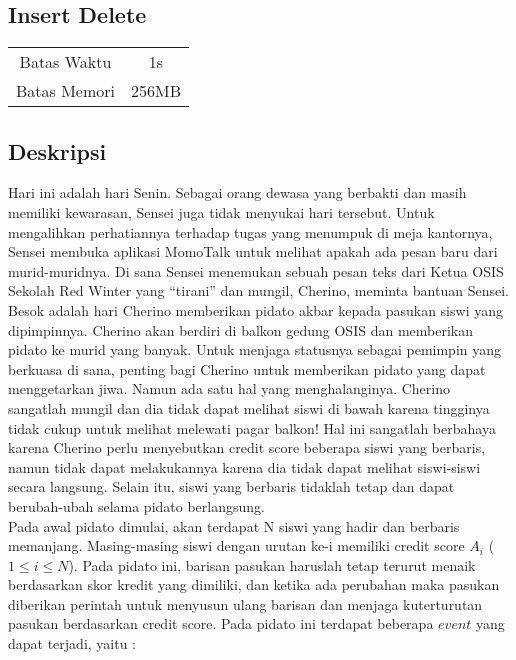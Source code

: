 \documentclass{article}
\begin{document}
\begin{center}

    
    \section*{Insert Delete} %

    \begin{tabular}{ | c c | }
        \hline
        Batas Waktu  & 1s \\    %
        Batas Memori & 256MB \\  %
        \hline
    \end{tabular}
\end{center}

\subsection*{Deskripsi}

Hari ini adalah hari Senin. Sebagai orang dewasa yang berbakti dan masih memiliki kewarasan, Sensei juga tidak menyukai hari tersebut. Untuk mengalihkan perhatiannya terhadap tugas yang menumpuk di meja kantornya, Sensei membuka aplikasi MomoTalk untuk melihat apakah ada pesan baru dari murid-muridnya. Di sana Sensei menemukan sebuah pesan teks dari Ketua OSIS Sekolah Red Winter yang “tirani” dan mungil, Cherino, meminta bantuan Sensei. Besok adalah hari Cherino memberikan pidato akbar kepada pasukan siswi yang dipimpinnya. Cherino akan berdiri di balkon gedung OSIS dan memberikan pidato ke murid yang banyak. Untuk menjaga statusnya sebagai pemimpin yang berkuasa di sana, penting bagi Cherino untuk memberikan pidato yang dapat menggetarkan jiwa. Namun ada satu hal yang menghalanginya. Cherino sangatlah mungil dan dia tidak dapat melihat siswi di bawah karena tingginya tidak cukup untuk melihat melewati pagar balkon! Hal ini sangatlah berbahaya karena Cherino perlu menyebutkan credit score beberapa siswi yang berbaris, namun tidak dapat melakukannya karena dia tidak dapat melihat siswi-siswi secara langsung. Selain itu, siswi yang berbaris tidaklah tetap dan dapat berubah-ubah selama pidato berlangsung.\\

Pada awal pidato dimulai, akan terdapat N siswi yang hadir dan berbaris memanjang. Masing-masing siswi dengan urutan ke-i memiliki credit score $A_i$ ($1 \leq i \leq N$). Pada pidato ini, barisan pasukan haruslah tetap terurut menaik berdasarkan skor kredit yang dimiliki, dan ketika ada perubahan maka pasukan diberikan perintah untuk menyusun ulang barisan dan menjaga kuterturutan pasukan berdasarkan credit score. Pada pidato ini terdapat beberapa $event$ yang dapat terjadi, yaitu :
\end{document}
